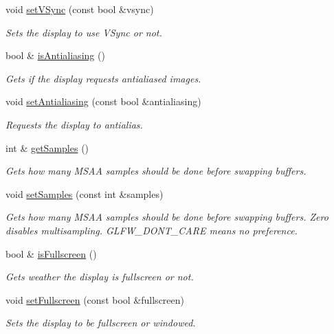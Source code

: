 \begin{DoxyCompactItemize}
void \hyperlink{classflounder_1_1display_a172501e1e99cde228d86fab59a3a636b}{set\+V\+Sync} (const bool \&vsync)
\begin{DoxyCompactList}\small\item\em Sets the display to use V\+Sync or not. \end{DoxyCompactList}\item 
bool \& \hyperlink{classflounder_1_1display_a5542894b942b11b8fa30e51e98a389ba}{is\+Antialiasing} ()
\begin{DoxyCompactList}\small\item\em Gets if the display requests antialiased images. \end{DoxyCompactList}\item 
void \hyperlink{classflounder_1_1display_ae9a340bfa09dfd6d08ebc0d21b4c77b0}{set\+Antialiasing} (const bool \&antialiasing)
\begin{DoxyCompactList}\small\item\em Requests the display to antialias. \end{DoxyCompactList}\item 
int \& \hyperlink{classflounder_1_1display_ab498a060b8f23e54be9116f452a8b92a}{get\+Samples} ()
\begin{DoxyCompactList}\small\item\em Gets how many M\+S\+AA samples should be done before swapping buffers. \end{DoxyCompactList}\item 
void \hyperlink{classflounder_1_1display_ae1bf2028faaf411fedc80ca511a2e739}{set\+Samples} (const int \&samples)
\begin{DoxyCompactList}\small\item\em Gets how many M\+S\+AA samples should be done before swapping buffers. Zero disables multisampling. G\+L\+F\+W\+\_\+\+D\+O\+N\+T\+\_\+\+C\+A\+RE means no preference. \end{DoxyCompactList}\item 
bool \& \hyperlink{classflounder_1_1display_a70a2476a798800089f947e4ff98476ba}{is\+Fullscreen} ()
\begin{DoxyCompactList}\small\item\em Gets weather the display is fullscreen or not. \end{DoxyCompactList}\item 
void \hyperlink{classflounder_1_1display_ae5ee27f982e6a947305dc6e71a23021b}{set\+Fullscreen} (const bool \&fullscreen)
\begin{DoxyCompactList}\small\item\em Sets the display to be fullscreen or windowed. \end{DoxyCompactList}\item 

\end{DoxyCompactItemize}
